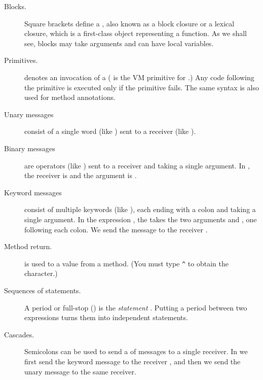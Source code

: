 \documentclass[a4paper,10pt,twoside]{book}
\begin{document}
\begin{description}
\item[Blocks.] Square brackets \ct{[ ]} define a , also known as a block closure or a lexical closure, which is a first-class object representing a function.
		As we shall see, blocks may take arguments and can have local variables.

\item[Primitives.]	 denotes an invocation of a  
	( is the VM primitive for .)
	Any code following the primitive is executed only if the primitive fails.
	The same syntax is also used for method annotations.

\item[Unary messages] consist of a single word (like ) sent to a receiver (like ).

\item[Binary messages] are operators (like \ct{+}) sent to a receiver and taking a single argument. In , the receiver is  and the argument is .

\item[Keyword messages] consist of multiple keywords (like ), each ending with a colon and taking a single argument. 
In the expression , the   takes the two arguments  and , one following each colon.  We send the message to the receiver .

\item[Method return.] \ct{^} is used to  a value from a method.  (You must type \verb|^| to obtain the \ct{^} character.)

\item[Sequences of statements.]	A period or full-stop () is the \emph{statement} . Putting a period between two expressions turns them into independent statements.	

\item[Cascades.] Semicolons can be used to send a  of messages to a single receiver.  In  we first send the keyword message  to the receiver , and then we send the unary message  to the same receiver.

\end{description}
\end{document}
